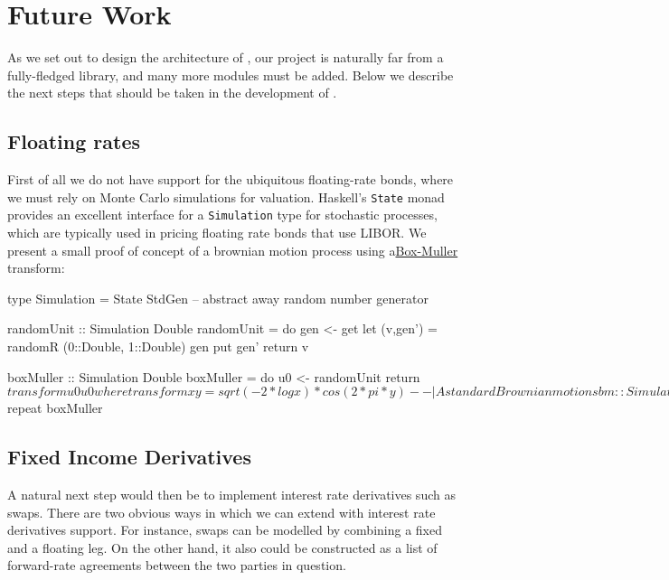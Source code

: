 \chapter{Future Work}

As we set out to design the architecture of \hql, our project is naturally far 
from a fully-fledged library, and many more modules must be added. Below we
describe the next steps that should be taken in the development of \hql.

\section{Floating rates}

First of all we do not have support for the ubiquitous floating-rate bonds, 
where we must rely on Monte Carlo simulations for valuation. Haskell's 
\texttt{State} monad provides an excellent interface for a \texttt{Simulation}
type for stochastic processes, which are typically used in pricing floating
rate bonds that use LIBOR. We present a small proof of concept of a brownian
motion process using a\href{http://en.wikipedia.org/wiki/Box%E2%80%93Muller_transform}{Box-Muller} transform:


\begin{hscode}
type Simulation = State StdGen -- abstract away random number generator

randomUnit :: Simulation Double
randomUnit = do
               gen <- get
               let (v,gen') = randomR (0::Double, 1::Double) gen
               put gen'
               return v

boxMuller :: Simulation Double
boxMuller = do
  u0 <- randomUnit
  return $ transform u0 u0
  where transform x y = sqrt(-2*log x)*cos(2*pi*y)

-- | A standard Brownian motion
sbm :: Simulation [Double]
sbm = sequence $ repeat boxMuller
\end{hscode}

\section{Fixed Income Derivatives}

A natural next step would then be to implement interest rate derivatives such 
as swaps. There are two obvious ways in which we can extend \hql with interest rate 
derivatives support. For instance, swaps can be modelled by combining a fixed 
and a floating leg. On the other hand, it also could be constructed as a list of 
forward-rate agreements between the two parties in question.\\

